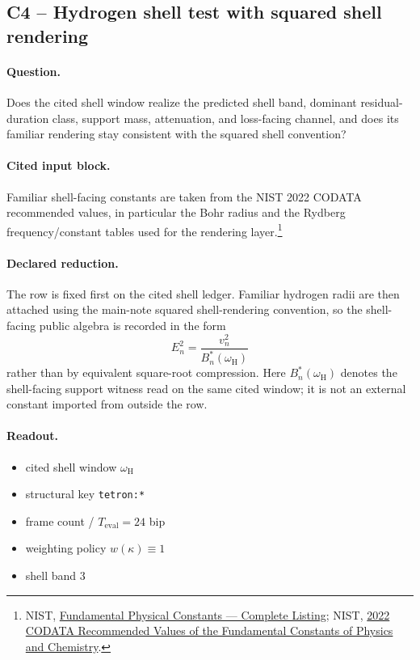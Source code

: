 \subsection{C4 -- Hydrogen shell test with squared shell rendering}\label{app:c4}
\paragraph{Question.} Does the cited shell window realize the predicted shell band, dominant residual-duration class, support mass, attenuation, and loss-facing channel, and does its familiar rendering stay consistent with the squared shell convention?

\paragraph{Cited input block.} Familiar shell-facing constants are taken from the NIST 2022 CODATA recommended values, in particular the Bohr radius and the Rydberg frequency/constant tables used for the rendering layer.\footnote{NIST, \href{https://physics.nist.gov/cuu/Constants/Table/allascii.txt}{Fundamental Physical Constants --- Complete Listing}; NIST, \href{https://physics.nist.gov/cuu/pdf/wallet_2022.pdf}{2022 CODATA Recommended Values of the Fundamental Constants of Physics and Chemistry}.}

\paragraph{Declared reduction.} The row is fixed first on the cited shell ledger. Familiar hydrogen radii are then attached using the main-note squared shell-rendering convention, so the shell-facing public algebra is recorded in the form
\[
E_n^2 = \frac{v_n^2}{B_n^*(\omega_{\mathrm{H}})}
\]
rather than by equivalent square-root compression. Here $B_n^*(\omega_{\mathrm{H}})$ denotes the shell-facing support witness read on the same cited window; it is not an external constant imported from outside the row.

\paragraph{Readout.}
\begin{itemize}
\item cited shell window $\omega_{\mathrm{H}}$
\item structural key \texttt{tetron:*}
\item frame count / $T_{\mathrm{eval}}=24$ bip
\item weighting policy $w(\kappa)\equiv 1$
\item shell band $3$
\end{itemize}

